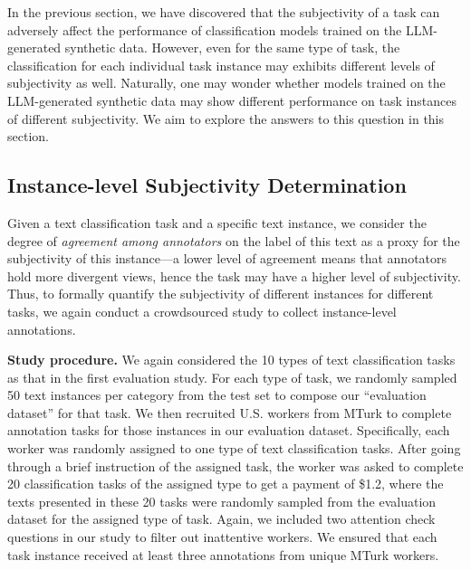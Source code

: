 In the previous section, we have discovered that the subjectivity of a task can adversely affect the performance of classification models trained on the LLM-generated synthetic data. However, even for the same type of task, the classification for each individual task instance may exhibits different levels of subjectivity as well. Naturally, one may wonder whether models trained on the LLM-generated synthetic data may show different performance on task instances of different subjectivity. We aim to explore the answers to this question in this section.

\subsection{Instance-level Subjectivity Determination}
Given a text classification task and a specific text instance, we consider the degree of {\em agreement among annotators} on the label of this text as a proxy for the subjectivity of this instance---a lower level of agreement means that annotators hold more divergent views, hence the task may have a higher level of subjectivity. Thus, to formally quantify the subjectivity of different instances for different tasks, we again conduct a crowdsourced study to collect instance-level annotations.

\noindent \textbf{Study procedure.} We again considered the 10 types of text classification tasks as that in the first evaluation study. For each type of task, we randomly sampled 50 text instances per category from the test set to compose our ``evaluation dataset'' for that task.
We then recruited U.S. workers from MTurk to complete annotation tasks for those instances in our evaluation dataset. Specifically,  each worker was randomly assigned to one type of text classification tasks. After going through a brief 
instruction of the assigned task, 
the worker was asked to complete 20 classification tasks of the assigned type to get a payment of \$1.2, where the texts presented in these 20 tasks were randomly sampled from the evaluation dataset for the assigned type of task.  
Again, we included two attention check questions in our study to filter out inattentive workers.  We ensured that each task instance received at least three annotations from unique MTurk workers. 

